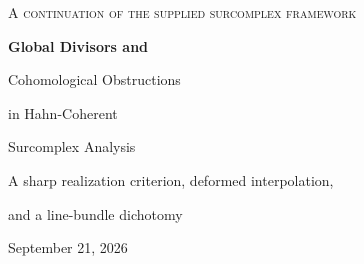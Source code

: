 \documentclass[11pt,letterpaper]{article}
\theoremstyle{definition}
\theoremstyle{remark}
\numberwithin{equation}{section}
\begin{document}
\hypersetup{pageanchor=false}
\begin{titlepage}
\centering
\vspace*{0.7cm}
{\large\scshape A continuation of the supplied surcomplex framework\par}
\vspace{0.75cm}
{\Huge\bfseries Global Divisors and\par Cohomological Obstructions\par}
\vspace{0.45cm}
{\LARGE in Hahn-Coherent\par Surcomplex Analysis\par}
\vspace{0.75cm}
{\large A sharp realization criterion, deformed interpolation,\par and a line-bundle dichotomy\par}
\vspace{0.75cm}
{\large September 21, 2026\par}
\vspace{0.5cm}
\begin{minipage}{0.93\textwidth}
\begin{abstract}
We study global existence questions for well-ordered Hahn families of ordinary holomorphic functions, evaluated on infinitesimal thickenings of the complex plane. Local preparation alone does not settle these questions: independently permissible local data may require a globally forbidden decreasing sequence of exponents.

We prove an exact criterion for realizing a discrete family of finite infinitesimal zero clusters by one Hahn-coherent entire datum. The criterion is well ordering of the union of supports of the \emph{symmetric coefficients} of the cluster polynomials. Individual root supports need not satisfy it. We then prove a support-restricted Chinese remainder theorem, an all-order deformed Hermite interpolation theorem, and a corresponding Mittag--Leffler theorem for moving poles.


\end{abstract}
\end{minipage}
\end{titlepage}
\end{document}
